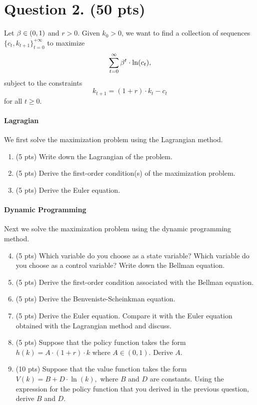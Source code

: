\documentclass[letterpaper,12pt,leqno]{article}
\begin{document}
\section*{Question 2. (50 pts)}

Let $\beta \in (0,1)$ and $r>0$. Given $k_{0}>0$, we want to find a collection of sequences $\{c_{t},k_{t+1}\}_{t=0}^{+\infty}$ to maximize 
\begin{equation*}
\sum_{t=0}^{\infty }\b^{t} \cdot \ln(c_{t}), 
\end{equation*}
subject to the constraints
\begin{equation*}
k_{t+1}=(1+r)\cdot k_{t}-c_{t}
\end{equation*}
for all $t\geq 0$.

\paragraph{Lagragian} We first solve the maximization problem using the Lagrangian method.

\begin{enumerate}
\item (5 pts) Write down the Lagrangian of the problem.
\item (5 pts) Derive the first-order condition(s) of the maximization problem.
\item (5 pts) Derive the Euler equation.
\end{enumerate}

\paragraph{Dynamic Programming} Next we solve the maximization problem using the dynamic programming method.

\begin{enumerate}\setcounter{enumi}{3}

\item (5 pts) Which variable do you choose as a state variable? Which variable do you choose as a control variable? Write down the Bellman equation.

\item (5 pts)  Derive the first-order condition associated with the Bellman equation.

\item (5 pts)  Derive the Benveniste-Scheinkman equation.

\item (5 pts)  Derive the Euler equation. Compare it with the Euler equation obtained with the Lagrangian method and discuss.

\item (5 pts) Suppose that the policy function takes the form $h(k)=A\cdot (1+r)\cdot k$ where $A\in (0,1) $. Derive $A$.

\item (10 pts) Suppose that the value function takes the form $V(k)=B+D\cdot \ln(k),$ where $B$ and $D$ are constants. Using the expression for the policy function that you derived in the previous question, derive $B$ and $D$.

\end{enumerate}
\end{document}
